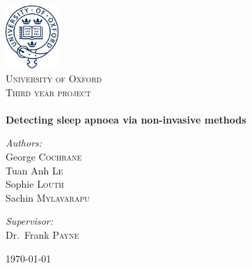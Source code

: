 \begin{titlepage}
\begin{center}

\includegraphics[width=0.15\textwidth]{drawings/oxford.png}~\\[1cm]

\textsc{\LARGE University of Oxford}\\[1.5cm]

\textsc{\Large Third year project}\\[0.5cm]

\HRule \\[0.4cm]
{\huge \bfseries Detecting sleep apnoea via non-invasive methods}
\HRule \\[1.5cm]

\begin{minipage}{0.4\textwidth}
\begin{flushleft} \large
\emph{Authors:}\\
George \textsc{Cochrane}\\
Tuan Anh \textsc{Le}\\
Sophie \textsc{Louth}\\
Sachin \textsc{Mylavarapu}
\end{flushleft}
\end{minipage}
\begin{minipage}{0.4\textwidth}
\begin{flushright} \large
\emph{Supervisor:} \\
Dr.~Frank \textsc{Payne}
\end{flushright}
\end{minipage}

\vfill

{\large \today}

\end{center}
\end{titlepage}